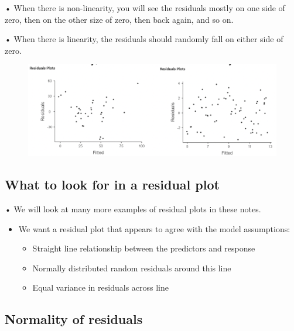\documentclass[
  letterpaper,
  DIV=11,
  numbers=noendperiod]{scrreprt}
\begin{document}
• When there is non-linearity, you will see the residuals mostly on one
side of zero, then on the other size of zero, then back again, and so
on.

• When there is linearity, the residuals should randomly fall on either
side of zero.

\begin{figure}

{\centering \includegraphics{images/mod4_pt1_5.png}

}

\end{figure}

\hypertarget{what-to-look-for-in-a-residual-plot}{%
\subsection{What to look for in a residual
plot}\label{what-to-look-for-in-a-residual-plot}}

• We will look at many more examples of residual plots in these notes.

\begin{itemize}
\item
  We want a residual plot that appears to agree with the model
  assumptions:

  \begin{itemize}
  \item
    Straight line relationship between the predictors and response
  \item
    Normally distributed random residuals around this line
  \item
    Equal variance in residuals across line
  \end{itemize}
\end{itemize}

\hypertarget{normality-of-residuals}{%
\subsection{Normality of residuals}\label{normality-of-residuals}}
\end{document}
